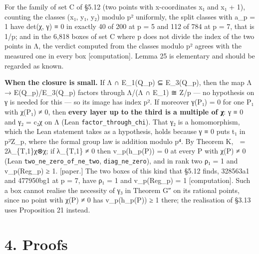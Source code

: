 \documentclass[11pt,a4paper]{article}
\theoremstyle{named}
\begin{document}
For the family of set C of §5.12 (two points with x-coordinates x₁ and x₁ + 1), counting the classes (x₁, y₁, y₂) modulo p² uniformly, the split classes with a\_p = 1 have det(χ, γ) ≡ 0 in exactly 40 of 200 at p = 5 and 112 of 784 at p = 7, that is 1/p; and in the 6,818 boxes of set C where p does not divide the index of the two points in Λ, the verdict computed from the classes modulo p² agrees with the measured one in every box [computation]. Lemma 25 is elementary and should be regarded as known.

\textbf{When the closure is small.} If Λ ∩ E\_1(Q\_p) ⊆ E\_3(Q\_p), then the map Λ → E(Q\_p)/E\_3(Q\_p) factors through Λ/(Λ ∩ E\_1) ≅ Z/p — no hypothesis on γ is needed for this — so its image has index p². If moreover γ(P₁) = 0 for one P₁ with χ(P₁) ≠ 0, then \textbf{every layer up to the third is a multiple of χ}: γ ≡ 0 and γ₂ = c₂χ on Λ (Lean \texttt{factor\_\allowbreak{}through\_\allowbreak{}chi}). That γ₂ is a homomorphism, which the Lean statement takes as a hypothesis, holds because γ ≡ 0 puts t₁ in p²Z\_p, where the formal group law is addition modulo p⁴. By Theorem K,  = 2λ\_\{T,1\}χ⊗χ; if λ\_\{T,1\} ≠ 0 then v\_p(h\_p(P)) = 0 at every P with χ(P) ≠ 0 (Lean \texttt{two\_\allowbreak{}ne\_\allowbreak{}zero\_\allowbreak{}of\_\allowbreak{}ne\_\allowbreak{}two}, \texttt{diag\_\allowbreak{}ne\_\allowbreak{}zero}), and in rank two ρ₁ = 1 and v\_p(Reg\_p) ≥ 1. [paper.] The two boxes of this kind that §5.12 finds, 328563a1 and 477950bg1 at p = 7, have ρ₁ = 1 and v\_p(Reg\_p) = 1 [computation]. Such a box cannot realise the necessity of γ₃ in Theorem G″ on its rational points, since no point with χ(P) ≠ 0 has v\_p(h\_p(P)) ≥ 1 there; the realisation of §3.13 uses Proposition 21 instead.

\section*{4. Proofs}
\end{document}
